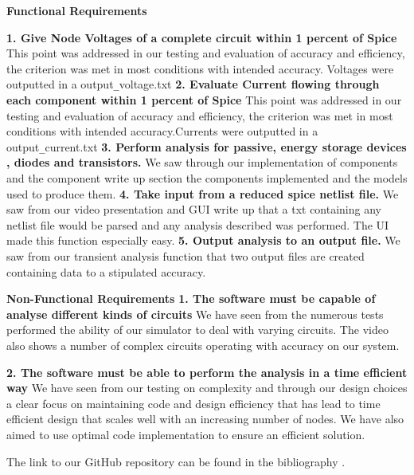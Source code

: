 \documentclass{article}
\begin{document}
\textbf{Functional Requirements}

\medbreak

\textbf{1. Give Node Voltages of a complete circuit within 1 percent of Spice}
\newline
This point was addressed in our testing and evaluation of accuracy and efficiency, the criterion was met in most conditions with intended accuracy. Voltages were outputted in a output\verb|_|voltage.txt
\smallbreak
\textbf{2. Evaluate Current flowing through each component within 1 percent of Spice}
\newline
This point was addressed in our testing and evaluation of accuracy and efficiency, the criterion was met in most conditions with intended accuracy.Currents were outputted in a output\verb|_|current.txt
\smallbreak
\textbf{3. Perform analysis for passive, energy storage devices , diodes and transistors.}
\newline
We saw through our implementation of components and the component write up section the components implemented and the models used to produce them.
\smallbreak
\textbf{4. Take input from a reduced spice netlist file.}
\newline
We saw from our video presentation and GUI write up that a txt containing any netlist file would be parsed and any analysis described was performed. The UI made this function especially easy.
\smallbreak
\textbf{5. Output analysis to an output file.}
\newline
We saw from our transient analysis function that two output files are created containing data to a stipulated accuracy.


\bigbreak

\textbf{Non-Functional Requirements}
\medbreak
\textbf{1. The software must be capable of analyse different kinds of circuits}
\newline
We have seen from the numerous tests performed the ability of our simulator to deal with varying circuits. The video also shows a number of complex circuits operating with accuracy on our system. 

\smallbreak

\textbf{2. The software must be able to perform the analysis in a time efficient way}
\newline
We have seen from our testing on complexity and through our design choices a clear focus on maintaining code and design efficiency that has lead to time efficient design that scales well with an increasing number of nodes. We have also aimed to use optimal code implementation to ensure an efficient solution. 

\bigbreak
The link to our GitHub repository can be found in the bibliography \cite{GitHub}.



\newpage



\end{document}
